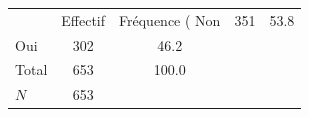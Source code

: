 {
\def\sym#1{\ifmmode^{#1}\else\(^{#1}\)\fi}
\begin{tabular}{l*{1}{cc}}
\toprule
            &    Effectif&Fréquence (%
\midrule
Non         &         351&        53.8\\
Oui         &         302&        46.2\\
Total       &         653&       100.0\\
\midrule
\(N\)       &         653&            \\
\bottomrule
\end{tabular}
}

